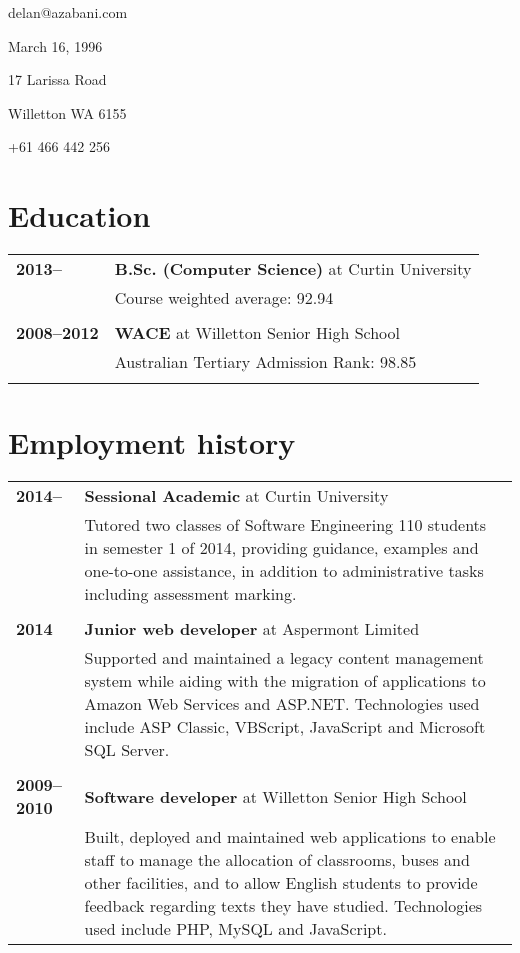 \documentclass[a4paper,12pt]{article}
\begin{document}
\hrulefill

\hspace{1cm}\begin{minipage}{7cm}
	{\Huge delan\textcolor{lg}@azabani\textcolor{lg}{.com}}
\end{minipage}\hfill\begin{minipage}{4cm}
	\hfill	March 16, 1996		\par
	\hfill	17 Larissa Road		\par
	\hfill	Willetton WA 6155	\par
	\hfill	+61 466 442 256		\par
\end{minipage}\hspace{1cm}

\hrulefill

\section*{Education}

\begin{tabular}{p{3.5cm}p{12.5cm}}
	\textbf{2013--} &
		\textbf{B.Sc. (Computer Science)} at Curtin University\\
		& Course weighted average: 92.94\\\\
	\textbf{2008--2012} &
		\textbf{WACE} at Willetton Senior High School\\
		& Australian Tertiary Admission Rank: 98.85\\\\
\end{tabular}

\section*{Employment history}

\begin{tabular}{p{3.5cm}p{12.5cm}}
	\textbf{2014--} &
		\textbf{Sessional Academic} at Curtin University\\ &
		Tutored two classes of Software Engineering 110 students in
		semester 1 of 2014, providing guidance, examples and one-to-one
		assistance, in addition to administrative tasks including
		assessment marking.\\\\
	\textbf{2014} &
		\textbf{Junior web developer} at Aspermont Limited\\ &
		Supported and maintained a legacy content management system
		while aiding with the migration of applications to Amazon Web
		Services and ASP.NET. Technologies used include ASP Classic,
		VBScript, JavaScript and Microsoft SQL Server.\\\\
	\textbf{2009--2010} &
		\textbf{Software developer} at Willetton Senior High School\\ &
		Built, deployed and maintained web applications to enable staff
		to manage the allocation of classrooms, buses and other
		facilities, and to allow English students to provide feedback
		regarding texts they have studied. Technologies used include
		PHP, MySQL and JavaScript.\\
\end{tabular}
\end{document}
